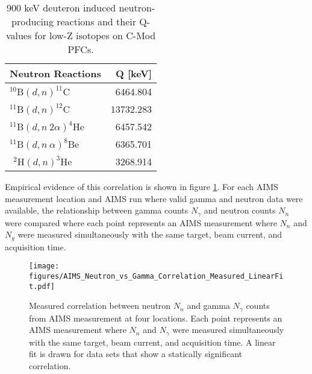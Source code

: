 \documentclass[final,3p,times,twocolumn]{elsarticle}
\begin{document}
\begin{table}[h]
\centering
 \begin{tabular}{lr}
  \hline Neutron Reactions & Q [keV]  \\ \hline \hline 
  $^\mathrm{10}$B$(d,n)^\mathrm{11}$C & 6464.804 \\
  $^\mathrm{11}$B$(d,n)^\mathrm{12}$C & 13732.283  \\
  $^\mathrm{11}$B$(d,n\: 2\alpha )^\mathrm{4}$He & 6457.542  \\
  $^\mathrm{11}$B$(d,n\: \alpha )^\mathrm{8}$Be & 6365.701 \\
  $^\mathrm{\;\;2}$H$(d,n)^\mathrm{3}$He & 3268.914 \\
  \hline
 \end{tabular}
\caption{900 keV deuteron induced neutron-producing reactions and their Q-values for low-Z isotopes on C-Mod PFCs.}
\label{tab:NeutronReactions}
\end{table}


Empirical evidence of this correlation is shown in figure \ref{fig:AIMSNeutronsGammaCorrelation}.  For each AIMS measurement location and AIMS run where valid gamma and neutron data were available, the relationship between gamma counts $N_\gamma$ and neutron counts $N_n$ were compared where each point represents an AIMS measurement where $N_n$ and $N_g$ were measured simultaneously with the same target, beam current, and acquisition time.

\begin{figure}[h]
 \centering
  \texttt{[image: figures/AIMS\_Neutron\_vs\_Gamma\_Correlation\_Measured\_LinearFit.pdf]}
 \caption{Measured correlation between neutron $N_n$ and gamma $N_\gamma$ counts from AIMS measurement at four locations. Each point represents an AIMS measurement where $N_n$ and $N_\gamma$ were measured simultaneously with the same target, beam current, and acquisition time.  A linear fit is drawn for data sets that show a statically significant correlation.}
 \label{fig:AIMSNeutronsGammaCorrelation}
\end{figure}
\end{document}
